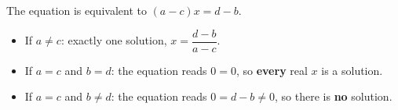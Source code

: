 The equation is equivalent to $(a-c)x=d-b$.
\begin{itemize}
\item If $a\ne c$: exactly one solution, $x=\boxed{\dfrac{d-b}{a-c}}$.
\item If $a=c$ and $b=d$: the equation reads $0=0$, so \textbf{every} real $x$ is a solution.
\item If $a=c$ and $b\ne d$: the equation reads $0=d-b\ne0$, so there is \textbf{no} solution.
\end{itemize}

